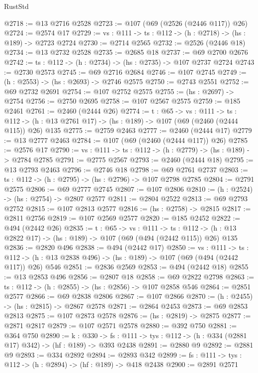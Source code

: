 \begin{lexlean}{RustStd}
\begin{coremodule}
{\begin{coremodule}
{{{{{{{{{@2718 := @13 @2716 @2528
@2723 := @107 (@69 (@2526 (@2446 @117)) @26)
@2724 := @2574 @17
@2729 := {vs : @111} -> {ts : @112} -> (h : @2718) -> (hs : @189) -> @2723 @2724
@2730 := @2714 @2565
@2732 := @2526 (@2446 @18)
@2734 := @13 @2732 @2528
@2735 := @2685 @18
@2737 := @69 @2700 @2676
@2742 := {ts : @112} -> (h : @2734) -> (hs : @2735) -> @107 @2737 @2724
@2743 := @2730 @2573
@2745 := @69 @2716 @2684
@2746 := @107 @2745
@2749 := (h : @2553) -> (hs : @2693) -> @2746 @2575
@2750 := @2743 @2551
@2752 := @69 @2732 @2691
@2754 := @107 @2752 @2575
@2755 := (hs : @2697) -> @2754
@2756 := @2750 @2695
@2758 := @107 @2567 @2575
@2759 := @185 @2461
@2761 := @2460 (@2444 @26)
@2774 := {t : @65} ->
  {vs : @111} ->
  {ts : @112} -> (h : @13 @2761 @17) -> (hs : @189) -> @107 (@69 (@2460 (@2444 @115)) @26) @135
@2775 := @2759 @2463
@2777 := @2460 (@2444 @17)
@2779 := @13 @2777 @2463
@2784 := @107 (@69 (@2460 (@2444 @117)) @26)
@2785 := @2576 @17
@2790 := {vs : @111} -> {ts : @112} -> (h : @2779) -> (hs : @189) -> @2784 @2785
@2791 := @2775 @2567
@2793 := @2460 (@2444 @18)
@2795 := @13 @2793 @2463
@2796 := @2746 @18
@2798 := @69 @2761 @2737
@2803 := {ts : @112} -> (h : @2795) -> (hs : @2796) -> @107 @2798 @2785
@2804 := @2791 @2575
@2806 := @69 @2777 @2745
@2807 := @107 @2806
@2810 := (h : @2524) -> (hs : @2754) -> @2807 @2577
@2811 := @2804 @2522
@2813 := @69 @2793 @2752
@2815 := @107 @2813 @2577
@2816 := (hs : @2758) -> @2815
@2817 := @2811 @2756
@2819 := @107 @2569 @2577
@2820 := @185 @2452
@2822 := @494 (@2442 @26)
@2835 := {t : @65} ->
  {vs : @111} ->
  {ts : @112} -> (h : @13 @2822 @17) -> (hs : @189) -> @107 (@69 (@494 (@2442 @115)) @26) @135
@2836 := @2820 @496
@2838 := @494 (@2442 @17)
@2850 := {vs : @111} ->
  {ts : @112} -> (h : @13 @2838 @496) -> (hs : @189) -> @107 (@69 (@494 (@2442 @117)) @26) @546
@2851 := @2836 @2569
@2853 := @494 (@2442 @18)
@2855 := @13 @2853 @496
@2856 := @2807 @18
@2858 := @69 @2822 @2798
@2863 := {ts : @112} -> (h : @2855) -> (hs : @2856) -> @107 @2858 @546
@2864 := @2851 @2577
@2866 := @69 @2838 @2806
@2867 := @107 @2866
@2870 := (h : @2455) -> (hs : @2815) -> @2867 @2578
@2871 := @2864 @2453
@2873 := @69 @2853 @2813
@2875 := @107 @2873 @2578
@2876 := (hs : @2819) -> @2875
@2877 := @2871 @2817
@2879 := @107 @2571 @2578
@2880 := @392 @750
@2881 := @364 @750
@2890 := {k : @330} ->
  {fs : @111} -> {tys : @112} -> (h : @334 (@2881 @17) @342) -> (hf : @189) -> @393 @2438
@2891 := @2880 @9
@2892 := @2881 @9
@2893 := @334 @2892
@2894 := @2893 @342
@2899 := {fs : @111} -> {tys : @112} -> (h : @2894) -> (hf : @189) -> @418 @2438
@2900 := @2891 @2571
}}}}}}}}}
\end{coremodule}}
\end{coremodule}
\end{lexlean}
